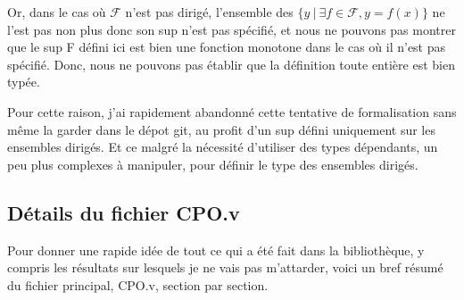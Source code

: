 \documentclass{article}
\newcommand\code[1]{{\fontfamily{lmtt}\selectfont #1}}
\theoremstyle{definition}
\begin{document}
Or, dans le cas où $\mathcal{F}$ n'est pas dirigé, l'ensemble des $\{y ~ | ~ \exists f \in \mathcal{F}, y = f(x)\}$ ne l'est pas non plus donc son sup n'est pas spécifié, et nous ne pouvons pas montrer que le \code{sup F} défini ici est bien une fonction monotone dans le cas où il n'est pas spécifié. Donc, nous ne pouvons pas établir que la définition toute entière est bien typée.

Pour cette raison, j'ai rapidement abandonné cette tentative de formalisation sans même la garder dans le dépot git, au profit d'un sup défini uniquement sur les ensembles dirigés. Et ce malgré la nécessité d'utiliser des types dépendants, un peu plus complexes à manipuler, pour définir le type des ensembles dirigés.



\subsection{Détails du fichier CPO.v}

Pour donner une rapide idée de tout ce qui a été fait dans la bibliothèque, y compris les résultats sur lesquels je ne vais pas m'attarder, voici un bref résumé du fichier principal, \code{CPO.v}, section par section.

\medskip
\end{document}
